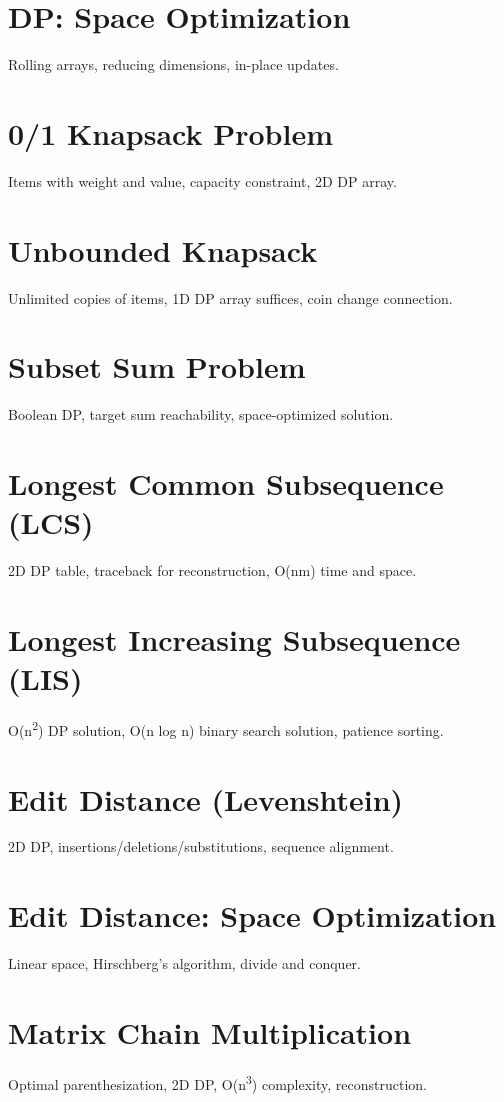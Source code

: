 \chapter{DP: Space Optimization}
Rolling arrays, reducing dimensions, in-place updates.

\chapter{0/1 Knapsack Problem}
Items with weight and value, capacity constraint, 2D DP array.

\chapter{Unbounded Knapsack}
Unlimited copies of items, 1D DP array suffices, coin change connection.

\chapter{Subset Sum Problem}
Boolean DP, target sum reachability, space-optimized solution.

\chapter{Longest Common Subsequence (LCS)}
2D DP table, traceback for reconstruction, O(nm) time and space.

\chapter{Longest Increasing Subsequence (LIS)}
O(n\textsuperscript{2}) DP solution, O(n log n) binary search solution, patience sorting.

\chapter{Edit Distance (Levenshtein)}
2D DP, insertions/deletions/substitutions, sequence alignment.

\chapter{Edit Distance: Space Optimization}
Linear space, Hirschberg's algorithm, divide and conquer.

\chapter{Matrix Chain Multiplication}
Optimal parenthesization, 2D DP, O(n\textsuperscript{3}) complexity, reconstruction.

